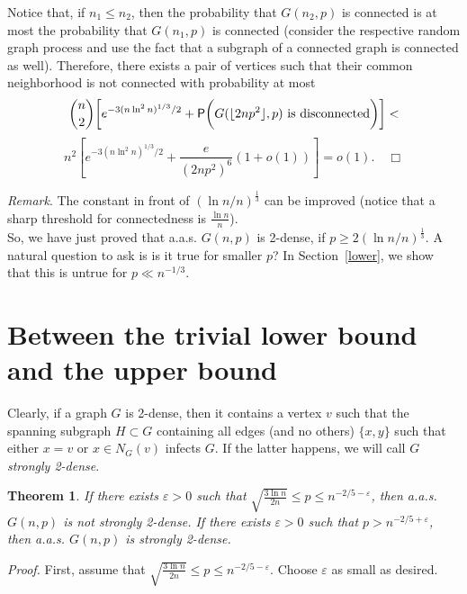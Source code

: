 \documentclass[]{article}
\newtheorem{theorem}{Theorem}%
\begin{document}
Notice that, if $n_1\leq n_2$, then the probability that $G(n_2,p)$ is connected is at most the probability that $G(n_1,p)$ is connected (consider the respective random graph process and use the fact that a subgraph of a connected graph is connected as well). Therefore, there exists a pair of vertices such that their common neighborhood is not connected with probability at most
$$
 {n\choose 2}\biggl[e^{-3(n\ln^2 n)^{1/3}/2}+{\sf P}\biggl(G(\lfloor 2np^2\rfloor,p)\text{ is disconnected}\biggr)\biggr]<
$$
$$
n^2\left[e^{-3(n\ln^2 n)^{1/3}/2}+\frac{e}{(2np^2)^6}(1+o(1))\right]=o(1).\quad\Box
$$


{\it Remark}. The constant in front of $(\ln n/n)^{\frac 13}$ can be improved (notice that a sharp threshold for connectedness is $\frac{\ln n}{n}$).\\

So, we have just proved that a.a.s. $G(n,p)$ is 2-dense, if $p\geq 2(\ln n/n)^{\frac 13}$. A natural question to ask is is it true for smaller $p$? In Section~\ref{lower}, we show that this is untrue for $p\ll n^{-1/3}$.



\section{Between the trivial lower bound and the upper bound}
\label{between}

Clearly, if a graph $G$ is 2-dense, then it contains a vertex $v$ such that the spanning subgraph $H\subset G$ containing all edges (and no others) $\{x,y\}$ such that either $x=v$ or $x\in N_G(v)$ infects $G$. If the latter happens, we will call $G$ {\it strongly 2-dense}.

\begin{theorem}
If there exists $\varepsilon>0$ such that $\sqrt{\frac{3\ln n}{2n}}\leq p\leq n^{-2/5-\varepsilon}$, then a.a.s. $G(n,p)$ is not strongly 2-dense. If there exists $\varepsilon>0$ such that $p>n^{-2/5+\varepsilon}$, then a.a.s. $G(n,p)$ is strongly 2-dense.
\label{strongly_dense}
\end{theorem}

{\it Proof.} First, assume that $\sqrt{\frac{3\ln n}{2n}}\leq p\leq n^{-2/5-\varepsilon}$. Choose $\varepsilon$ as small as desired.\\ %
\end{document}
